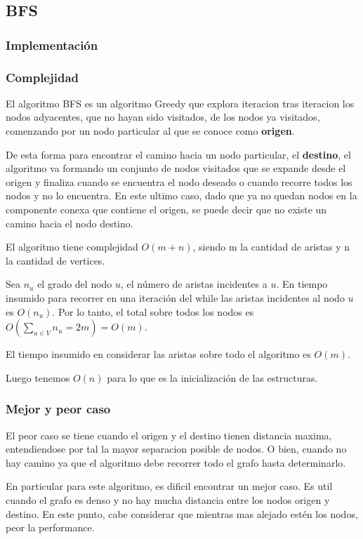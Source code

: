 \subsection{BFS}
\subsubsection{Implementación}

\subsubsection{Complejidad}
El algoritmo BFS es un algoritmo Greedy que explora iteracion tras iteracion los nodos adyacentes, que no hayan sido visitados, de los nodos ya visitados, comenzando por un nodo particular al que se conoce como \textbf{origen}. 

De esta forma para encontrar el camino hacia un nodo particular, el \textbf{destino}, el algoritmo va formando un conjunto de nodos visitados que se expande desde el origen y finaliza cuando se encuentra el nodo deseado o cuando recorre todos los nodos y no lo encuentra. En este ultimo caso, dado que ya no quedan nodos en la componente conexa que contiene el origen, se puede decir que no existe un camino hacia el nodo destino.

El algoritmo tiene complejidad $O(m + n)$, siendo m la cantidad de aristas y n la cantidad de vertices.

Sea $n_u$ el grado del nodo $u$, el número de aristas incidentes a $u$. En tiempo insumido para recorrer en una iteración del while las aristas incidentes al nodo $u$ es $O(n_u)$.
Por lo tanto, el total sobre todos los nodos es $O(\sum_{u\in V}{} n_u = 2m) = O(m)$.

El tiempo insumido en considerar las aristas sobre todo el algoritmo es $O(m)$.

Luego tenemos $O(n)$ para lo que es la inicialización de las estructuras.

\subsubsection{Mejor y peor caso}
El peor caso se tiene cuando el origen y el destino tienen distancia maxima, entendiendose por tal la mayor separacion posible de nodos. O bien, cuando no hay camino ya que el algoritmo debe recorrer todo el grafo hasta determinarlo.

En particular para este algoritmo, es dificil encontrar un mejor caso. Es util cuando el grafo es denso y no hay mucha distancia entre los nodos origen y destino. En este punto, cabe considerar que mientras mas alejado estén los nodos, peor la performance.

